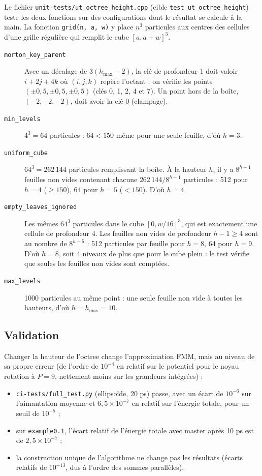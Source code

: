 \documentclass[11pt,a4paper]{article}
\newcommand{\code}[1]{\texttt{#1}}
\begin{document}
Le fichier \code{unit-tests/ut\_octree\_height.cpp} (cible \code{test\_ut\_octree\_height}) teste
les deux fonctions sur des configurations dont le résultat se calcule à la main. La fonction
\code{grid(n, a, w)} y place $n^3$ particules aux centres des cellules d'une grille régulière qui
remplit le cube $[a, a+w]^3$.

\begin{description}
  \item[\code{morton\_key\_parent}] Avec un décalage de $3(h_{\max} - 2)$, la clé de profondeur 1
        doit valoir $i + 2j + 4k$ où $(i, j, k)$ repère l'octant : on vérifie les points
        $(\pm 0{,}5, \pm 0{,}5, \pm 0{,}5)$ (clés 0, 1, 2, 4 et 7). Un point hors de la boîte,
        $(-2, -2, -2)$, doit avoir la clé 0 (clampage).
  \item[\code{min\_levels}] $4^3 = 64$ particules : $64 < 150$ même pour une seule feuille, d'où
        $h = 3$.
  \item[\code{uniform\_cube}] $64^3 = 262\,144$ particules remplissant la boîte. À la hauteur
        $h$, il y a $8^{h-1}$ feuilles non vides contenant chacune $262\,144/8^{h-1}$
        particules : 512 pour $h = 4$ ($\ge 150$), 64 pour $h = 5$ ($< 150$). D'où $h = 4$.
  \item[\code{empty\_leaves\_ignored}] Les mêmes $64^3$ particules dans le cube $[0, w/16]^3$,
        qui est exactement une cellule de profondeur 4. Les feuilles non vides de profondeur
        $h-1 \ge 4$ sont au nombre de $8^{h-5}$ : 512 particules par feuille pour $h = 8$,
        64 pour $h = 9$. D'où $h = 8$, soit 4 niveaux de plus que pour le cube plein : le
        test vérifie que seules les feuilles non vides sont comptées.
  \item[\code{max\_levels}] 1000 particules au même point : une seule feuille non vide à toutes
        les hauteurs, d'où $h = h_{\max} = 10$.
\end{description}

\subsection{Validation}

Changer la hauteur de l'octree change l'approximation FMM, mais au niveau de sa propre erreur
(de l'ordre de $10^{-4}$ en relatif sur le potentiel pour le noyau rotation à $P = 9$, nettement
moins sur les grandeurs intégrées) :
\begin{itemize}
  \item \code{ci-tests/full\_test.py} (ellipsoïde, 20 ps) passe, avec un écart de $10^{-6}$ sur
        l'aimantation moyenne et $6{,}5\times 10^{-7}$ en relatif sur l'énergie totale, pour un
        seuil de $10^{-5}$ ;
  \item sur \code{example0.1}, l'écart relatif de l'énergie totale avec master après 10 ps est
        de $2{,}5\times 10^{-7}$ ;
  \item la construction unique de l'algorithme ne change pas les résultats (écarts relatifs de
        $10^{-13}$, dus à l'ordre des sommes parallèles).
\end{itemize}
\end{document}
